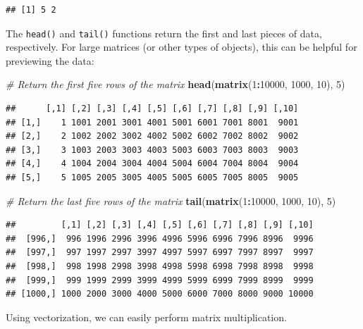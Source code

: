 \documentclass[]{book}
\newenvironment{Shaded}{\begin{snugshade}}{\end{snugshade}}
\newcommand{\CommentTok}[1]{\textcolor[rgb]{0.56,0.35,0.01}{\textit{#1}}}
\newcommand{\DecValTok}[1]{\textcolor[rgb]{0.00,0.00,0.81}{#1}}
\newcommand{\KeywordTok}[1]{\textcolor[rgb]{0.13,0.29,0.53}{\textbf{#1}}}
\newcommand{\NormalTok}[1]{#1}
\newcommand{\OperatorTok}[1]{\textcolor[rgb]{0.81,0.36,0.00}{\textbf{#1}}}
\begin{document}
\begin{verbatim}
## [1] 5 2
\end{verbatim}

The \texttt{head()} and \texttt{tail()} functions return the first and last pieces of data, respectively. For large matrices (or other types of objects), this can be helpful for previewing the data:

\begin{Shaded}
\begin{Highlighting}[]
\CommentTok{# Return the first five rows of the matrix}
\KeywordTok{head}\NormalTok{(}\KeywordTok{matrix}\NormalTok{(}\DecValTok{1}\OperatorTok{:}\DecValTok{10000}\NormalTok{, }\DecValTok{1000}\NormalTok{, }\DecValTok{10}\NormalTok{), }\DecValTok{5}\NormalTok{)}
\end{Highlighting}
\end{Shaded}

\begin{verbatim}
##      [,1] [,2] [,3] [,4] [,5] [,6] [,7] [,8] [,9] [,10]
## [1,]    1 1001 2001 3001 4001 5001 6001 7001 8001  9001
## [2,]    2 1002 2002 3002 4002 5002 6002 7002 8002  9002
## [3,]    3 1003 2003 3003 4003 5003 6003 7003 8003  9003
## [4,]    4 1004 2004 3004 4004 5004 6004 7004 8004  9004
## [5,]    5 1005 2005 3005 4005 5005 6005 7005 8005  9005
\end{verbatim}

\begin{Shaded}
\begin{Highlighting}[]
\CommentTok{# Return the last five rows of the matrix}
\KeywordTok{tail}\NormalTok{(}\KeywordTok{matrix}\NormalTok{(}\DecValTok{1}\OperatorTok{:}\DecValTok{10000}\NormalTok{, }\DecValTok{1000}\NormalTok{, }\DecValTok{10}\NormalTok{), }\DecValTok{5}\NormalTok{)}
\end{Highlighting}
\end{Shaded}

\begin{verbatim}
##         [,1] [,2] [,3] [,4] [,5] [,6] [,7] [,8] [,9] [,10]
##  [996,]  996 1996 2996 3996 4996 5996 6996 7996 8996  9996
##  [997,]  997 1997 2997 3997 4997 5997 6997 7997 8997  9997
##  [998,]  998 1998 2998 3998 4998 5998 6998 7998 8998  9998
##  [999,]  999 1999 2999 3999 4999 5999 6999 7999 8999  9999
## [1000,] 1000 2000 3000 4000 5000 6000 7000 8000 9000 10000
\end{verbatim}

Using vectorization, we can easily perform matrix multiplication.
\end{document}
